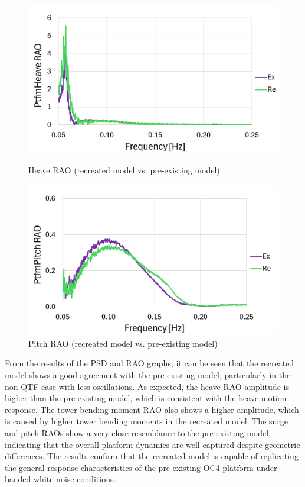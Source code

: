 \documentclass[a4paper, 11pt]{article}
\begin{document}
\begin{figure}[H]
    \begin{minipage}{0.48\textwidth}
        \centering
        \includegraphics[width=1\textwidth]{2.6_heave_mine_1.png}
        \caption{\small Heave RAO (recreated model vs. pre-existing model)}
        \label{fig:2.6_heave_mine_recreated}
    \end{minipage}
    \hfill
    \begin{minipage}{0.48\textwidth}
        \centering
        \includegraphics[width=1\textwidth]{2.6_pitch_mine_1.png}
        \caption{\small Pitch RAO (recreated model vs. pre-existing model)}
        \label{fig:2.6_pitch_mine_recreated}
    \end{minipage}
\end{figure}

From the results of the PSD and RAO graphs, it can be seen that the recreated model shows a good agreement with the pre-existing model, particularly in the non-QTF case with less oscillations. As expected, the heave RAO amplitude is higher than the pre-existing model, which is consistent with the heave motion response. The tower bending moment RAO also shows a higher amplitude, which is caused by higher tower bending moments in the recreated model. The surge and pitch RAOs show a very close resemblance to the pre-existing model, indicating that the overall platform dynamics are well captured despite geometric differences. The results confirm that the recreated model is capable of replicating the general response characteristics of the pre-existing OC4 platform under banded white noise conditions.
\end{document}
